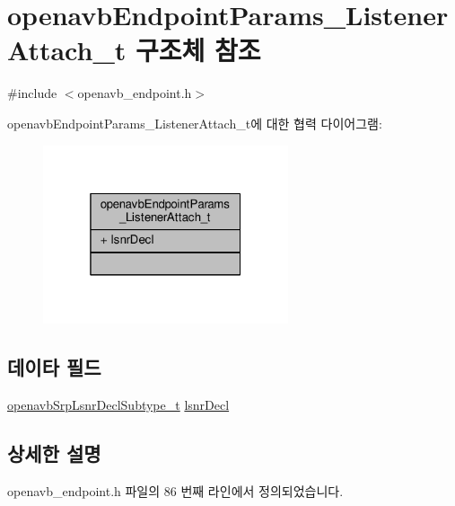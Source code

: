 \hypertarget{structopenavb_endpoint_params___listener_attach__t}{}\section{openavb\+Endpoint\+Params\+\_\+\+Listener\+Attach\+\_\+t 구조체 참조}
\label{structopenavb_endpoint_params___listener_attach__t}


{\ttfamily \#include $<$openavb\+\_\+endpoint.\+h$>$}



openavb\+Endpoint\+Params\+\_\+\+Listener\+Attach\+\_\+t에 대한 협력 다이어그램\+:
\nopagebreak
\begin{figure}[H]
\begin{center}
\leavevmode
\includegraphics[width=205pt]{structopenavb_endpoint_params___listener_attach__t__coll__graph}
\end{center}
\end{figure}
\subsection*{데이타 필드}
\begin{DoxyCompactItemize}
\item 
\hyperlink{openavb__srp__api_8h_afecaf0f6deca515a5b80d49fa8c3db8b}{openavb\+Srp\+Lsnr\+Decl\+Subtype\+\_\+t} \hyperlink{structopenavb_endpoint_params___listener_attach__t_a48a44c7abb58139ee25badb861e01a38}{lsnr\+Decl}
\end{DoxyCompactItemize}


\subsection{상세한 설명}


openavb\+\_\+endpoint.\+h 파일의 86 번째 라인에서 정의되었습니다.



